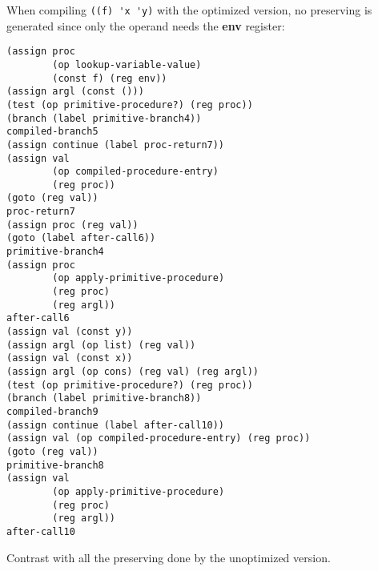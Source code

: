 \documentclass[a4paper,12pt]{article}
\begin{document}
When compiling \lstinline!((f) 'x 'y)! with the optimized version, no
preserving is generated since only the operand needs the \textbf{env}
register:

\begin{lstlisting}
(assign proc
        (op lookup-variable-value)
        (const f) (reg env))
(assign argl (const ()))
(test (op primitive-procedure?) (reg proc))
(branch (label primitive-branch4))
compiled-branch5
(assign continue (label proc-return7))
(assign val
        (op compiled-procedure-entry)
        (reg proc))
(goto (reg val))
proc-return7
(assign proc (reg val))
(goto (label after-call6))
primitive-branch4
(assign proc
        (op apply-primitive-procedure)
        (reg proc)
        (reg argl))
after-call6
(assign val (const y))
(assign argl (op list) (reg val))
(assign val (const x))
(assign argl (op cons) (reg val) (reg argl))
(test (op primitive-procedure?) (reg proc))
(branch (label primitive-branch8))
compiled-branch9
(assign continue (label after-call10))
(assign val (op compiled-procedure-entry) (reg proc))
(goto (reg val))
primitive-branch8
(assign val
        (op apply-primitive-procedure)
        (reg proc)
        (reg argl))
after-call10
\end{lstlisting}

Contrast with all the preserving done by the unoptimized version.
\end{document}
